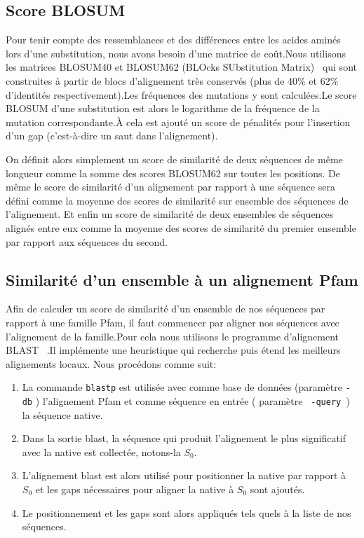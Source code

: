 \subsection{Score BLOSUM}

Pour tenir compte des ressemblances et des différences entre les acides aminés lors d'une substitution, nous avons besoin d'une matrice de coût.Nous utilisons les matrices BLOSUM40 et BLOSUM62 (BLOcks SUbstitution Matrix)~\citep{refBLOSUM} qui sont construites à partir de blocs d'alignement très conservés (plus de 40\% et 62\% d'identités respectivement).Les fréquences des mutations y sont calculées.Le score BLOSUM d'une substitution est alors le logarithme de la fréquence de la mutation correspondante.À cela est ajouté un score de pénalités pour l'insertion d'un gap (c'est-à-dire un saut dans l'alignement).

On définit alors simplement un score de similarité de deux séquences de même longueur comme la somme des scores BLOSUM62 sur toutes les positions. De même le score de similarité d'un alignement par rapport à une séquence sera défini comme la moyenne des scores de similarité sur ensemble des séquences de l'alignement. Et enfin un score de similarité de deux ensembles de séquences alignés entre eux comme la moyenne des scores de similarité du premier ensemble par rapport aux séquences du second.  

\subsection{Similarité d'un ensemble à un alignement Pfam}
\label{SimPfam}
Afin de calculer un score de similarité d'un ensemble de nos séquences par rapport à une famille Pfam, il faut commencer par aligner nos séquences avec l'alignement de la famille.Pour cela nous utilisons le programme d'alignement BLAST ~\citep{refBLAST}.Il implémente une heuristique qui recherche puis étend les meilleurs alignements locaux. Nous procédons comme suit:
\begin{enumerate}
\item La commande \verb!blastp! est utilisée avec comme base de données (paramètre \verb!-db! ) l'alignement Pfam et comme séquence en entrée ( paramètre \verb! -query !) la séquence native. 
\item Dans la sortie blast, la séquence qui produit l'alignement le plus significatif avec la native est collectée, notons-la $S_0$. 
\item L'alignement blast est alors utilisé pour positionner la native par rapport à $S_0$ et les gaps nécessaires pour aligner la native à $S_0$ sont ajoutés.
\item Le positionnement et les gaps sont alors appliqués tels quels à la liste de nos séquences.

\end{enumerate}

